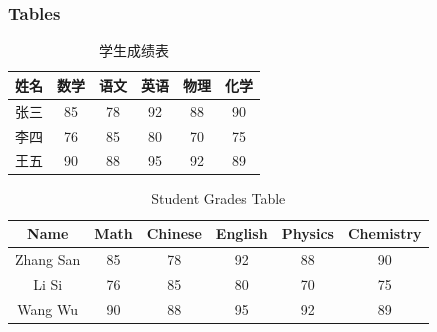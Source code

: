 \documentclass{cls/simplebeamer}
\begin{document}
\begin{frame}
  \frametitle{Tables}
  \begin{table}
    \centering
    \caption{学生成绩表}
    \begin{tabular}{|c|c|c|c|c|c|}
        \hline
        \textbf{姓名} & \textbf{数学} & \textbf{语文} & \textbf{英语} & \textbf{物理} & \textbf{化学} \\
        \hline
        张三 & 85 & 78 & 92 & 88 & 90 \\
        \hline
        李四 & 76 & 85 & 80 & 70 & 75 \\
        \hline
        王五 & 90 & 88 & 95 & 92 & 89 \\
        \hline
    \end{tabular}
\end{table}

\begin{table}[h]
  \centering
  \caption{Student Grades Table}
  \begin{tabular}{|c|c|c|c|c|c|}
      \hline
      Name & Math & Chinese & English & Physics & Chemistry \\
      \hline
      Zhang San & 85 & 78 & 92 & 88 & 90 \\
      \hline
      Li Si & 76 & 85 & 80 & 70 & 75 \\
      \hline
      Wang Wu & 90 & 88 & 95 & 92 & 89 \\
      \hline
  \end{tabular}
\end{table}
\end{frame}
\end{document}
